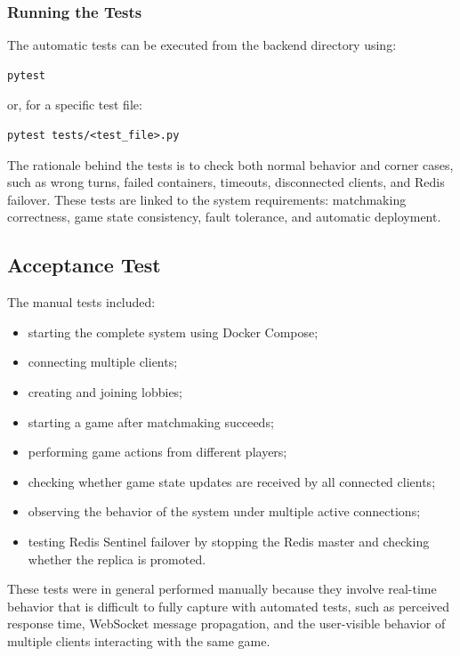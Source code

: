 \documentclass{scrartcl}
\begin{document}
\subsubsection{Running the Tests}

The automatic tests can be executed from the backend directory using:

\begin{verbatim}
pytest
\end{verbatim}

or, for a specific test file:

\begin{verbatim}
pytest tests/<test_file>.py
\end{verbatim}

The rationale behind the tests is to check both normal behavior and corner cases, such as wrong turns, failed containers, timeouts, disconnected clients, and Redis failover. These tests are linked to the system requirements: matchmaking correctness, game state consistency, fault tolerance, and automatic deployment.

\subsection{Acceptance Test}\label{acceptance-test}

The manual tests included:

\begin{itemize}
    \item starting the complete system using Docker Compose;
    \item connecting multiple clients;
    \item creating and joining lobbies;
    \item starting a game after matchmaking succeeds;
    \item performing game actions from different players;
    \item checking whether game state updates are received by all connected clients;
    \item observing the behavior of the system under multiple active connections;
    \item testing Redis Sentinel failover by stopping the Redis master and checking whether the replica is promoted.
\end{itemize}

These tests were in general performed manually because they involve real-time behavior that is difficult to fully capture with automated tests, such as perceived response time, WebSocket message propagation, and the user-visible behavior of multiple clients interacting with the same game.
\newpage
\end{document}
